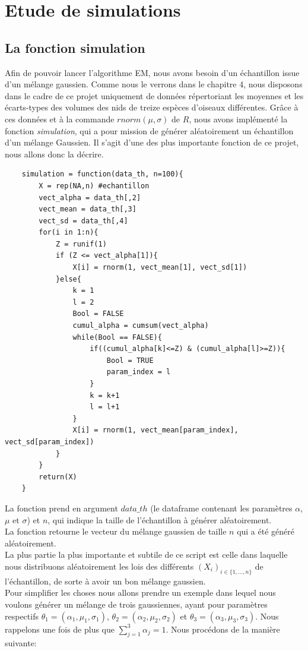 \documentclass[frenchb]{report}
\newcommand{\1}{\mathbbm{1}}
\theoremstyle{definition}\newtheorem{defn}{Définition}
\theoremstyle{definition}\newtheorem{exm}{Exemple}
\theoremstyle{definition}\newtheorem{nota}{Notation}
\theoremstyle{definition}\newtheorem{rem}{Remarque}
\begin{document}

\chapter{Etude de simulations}

\section{La fonction simulation}
Afin de pouvoir lancer l'algorithme EM, nous avons besoin d'un échantillon issue d'un mélange gaussien. Comme nous le verrons dans le chapitre 4, nous disposons dans le cadre de ce projet uniquement de données répertoriant les moyennes et les écarts-types des volumes des nids de treize espèces d'oiseaux différentes. Grâce à ces données et à la commande $rnorm(\mu, \sigma)$ de $R$, nous avons implémenté la fonction \textit{simulation}, qui a pour mission de générer aléatoirement un échantillon d'un mélange Gaussien. Il s'agit d'une des plus importante fonction de ce projet, nous allons donc la décrire.
\begin{lstlisting}
	simulation = function(data_th, n=100){
		X = rep(NA,n) #echantillon
		vect_alpha = data_th[,2]
		vect_mean = data_th[,3]
		vect_sd = data_th[,4]
		for(i in 1:n){
			Z = runif(1)
			if (Z <= vect_alpha[1]){
				X[i] = rnorm(1, vect_mean[1], vect_sd[1])
			}else{
				k = 1
				l = 2
				Bool = FALSE
				cumul_alpha = cumsum(vect_alpha)
				while(Bool == FALSE){
					if((cumul_alpha[k]<=Z) & (cumul_alpha[l]>=Z)){
						Bool = TRUE
						param_index = l
					}
					k = k+1
					l = l+1
				}
				X[i] = rnorm(1, vect_mean[param_index], vect_sd[param_index])
			}
		}
		return(X)
	}
\end{lstlisting}
La fonction prend en argument $data\_th$ (le dataframe contenant les paramètres $\alpha$, $\mu$ et $\sigma$) et $n$, qui indique la taille de l'échantillon à générer aléatoirement. \\
La fonction retourne le vecteur du mélange gaussien de taille $n$ qui a été généré aléatoirement. \\
La plus partie la plus importante et subtile de ce script est celle dans laquelle nous distribuons aléatoirement les lois des différents $(X_i)_{i \in \{1, \dots, n\}}$ de l'échantillon, de sorte à avoir un bon mélange gaussien. \\
Pour simplifier les choses nous allons prendre un exemple dans lequel nous voulons générer un mélange de trois gaussiennes, ayant pour paramètres respectifs $\theta_1 = (\alpha_1, \mu_1, \sigma_1)$, $\theta_2 = (\alpha_2, \mu_2, \sigma_2)$ et $\theta_3 = (\alpha_3, \mu_3, \sigma_3)$. Nous rappelons une fois de plus que  $\displaystyle\sum_{j=1}^{3} \alpha_j = 1$. Nous procédons de la manière suivante: \\
\end{document}
